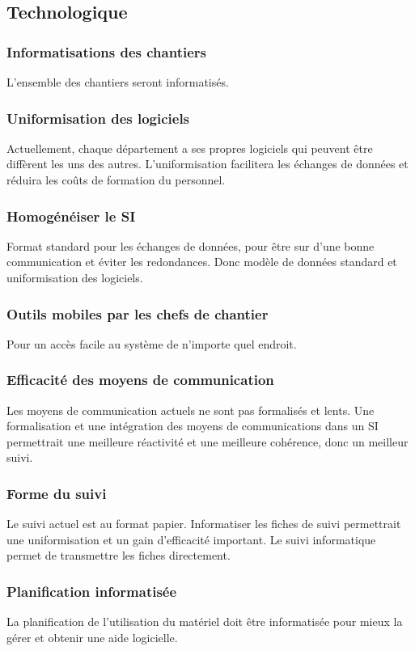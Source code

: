 \subsection{Technologique}

\subsubsection{Informatisations des chantiers}

L’ensemble des chantiers seront informatisés.

\subsubsection{Uniformisation des logiciels}

Actuellement, chaque département a ses propres logiciels qui peuvent être diffèrent
les uns des autres. L’uniformisation facilitera les échanges de données et réduira
 les coûts de formation du personnel.

\subsubsection{Homogénéiser le SI}

Format standard pour les échanges de données, pour être sur d’une bonne communication
 et éviter les redondances. Donc modèle de données standard et uniformisation des logiciels.

\subsubsection{Outils mobiles par les chefs de chantier}

Pour un accès facile au système de n’importe quel endroit.

\subsubsection{Efficacité des moyens de communication}

Les moyens de communication actuels ne sont pas formalisés et lents. 
Une formalisation et une intégration des moyens de communications dans un SI 
permettrait une meilleure réactivité et une meilleure cohérence, donc un meilleur suivi.

\subsubsection{Forme du suivi}

Le suivi actuel est au format papier. Informatiser les fiches de suivi permettrait
 une uniformisation et un gain d’efficacité important. Le suivi informatique 
permet de transmettre les fiches directement.

\subsubsection{Planification informatisée}
La planification de l’utilisation du matériel doit être informatisée pour mieux 
la gérer et obtenir une aide logicielle.

